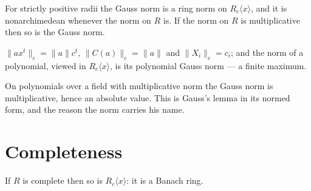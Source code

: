 \begin{theorem}
  \label{thm:restricted-normedring}
  \leanok
  For strictly positive radii the Gauss norm is a ring norm on $R_c\langle x \rangle$, and it is
  nonarchimedean whenever the norm on $R$ is.  If the norm on $R$ is multiplicative then so is
  the Gauss norm.
\end{theorem}


\begin{lemma}
  \label{lem:gaussnorm-values}
  \leanok
  $\lVert a x^t \rVert_c = \lVert a \rVert c^t$, $\lVert C(a) \rVert_c = \lVert a \rVert$ and
  $\lVert X_i \rVert_c = c_i$; and the norm of a polynomial, viewed in $R_c\langle x\rangle$, is
  its polynomial Gauss norm --- a finite maximum.
\end{lemma}

\begin{proposition}
  \label{prop:polynomial-gaussnorm}
  \leanok
  On polynomials over a field with multiplicative norm the Gauss norm is multiplicative, hence
  an absolute value.  This is Gauss's lemma in its normed form, and the reason the norm carries
  his name.
\end{proposition}

\section{Completeness}

\begin{theorem}
  \label{thm:restricted-complete}
  \leanok
  If $R$ is complete then so is $R_c \langle x \rangle$: it is a Banach ring.
\end{theorem}

